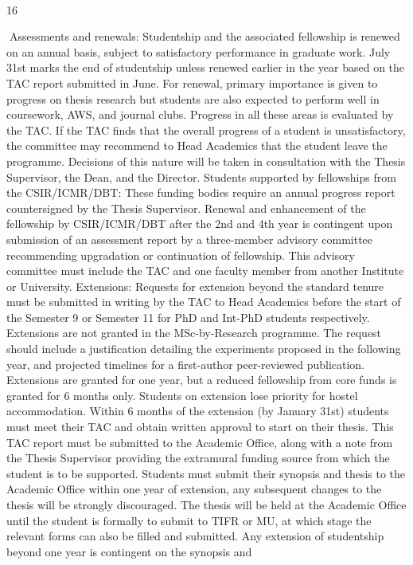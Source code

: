 \documentclass[a4paper,10pt]{article}
\begin{document}
	
  

16	
  

Assessments and renewals: Studentship and the associated fellowship is renewed on an
annual basis, subject to satisfactory performance in graduate work. July 31st marks the end
of studentship unless renewed earlier in the year based on the TAC report submitted in June.
For renewal, primary importance is given to progress on thesis research but students are also
expected to perform well in coursework, AWS, and journal clubs. Progress in all these areas
is evaluated by the TAC. If the TAC finds that the overall progress of a student is
unsatisfactory, the committee may recommend to Head Academics that the student leave the
programme. Decisions of this nature will be taken in consultation with the Thesis
Supervisor, the Dean, and the Director.
Students supported by fellowships from the CSIR/ICMR/DBT: These funding bodies
require an annual progress report countersigned by the Thesis Supervisor. Renewal and
enhancement of the fellowship by CSIR/ICMR/DBT after the 2nd and 4th year is contingent
upon submission of an assessment report by a three-member advisory committee
recommending upgradation or continuation of fellowship. This advisory committee must
include the TAC and one faculty member from another Institute or University.
Extensions: Requests for extension beyond the standard tenure must be submitted in writing
by the TAC to Head Academics before the start of the Semester 9 or Semester 11 for PhD
and Int-PhD students respectively. Extensions are not granted in the MSc-by-Research
programme. The request should include a justification detailing the experiments proposed in
the following year, and projected timelines for a first-author peer-reviewed publication.
Extensions are granted for one year, but a reduced fellowship from core funds is granted for
6 months only. Students on extension lose priority for hostel accommodation. Within 6
months of the extension (by January 31st) students must meet their TAC and obtain written
approval to start on their thesis. This TAC report must be submitted to the Academic Office,
along with a note from the Thesis Supervisor providing the extramural funding source from
which the student is to be supported. Students must submit their synopsis and thesis to the
Academic Office within one year of extension, any subsequent changes to the thesis will be
strongly discouraged. The thesis will be held at the Academic Office until the student is
formally to submit to TIFR or MU, at which stage the relevant forms can also be filled and
submitted. Any extension of studentship beyond one year is contingent on the synopsis and
\end{document}
